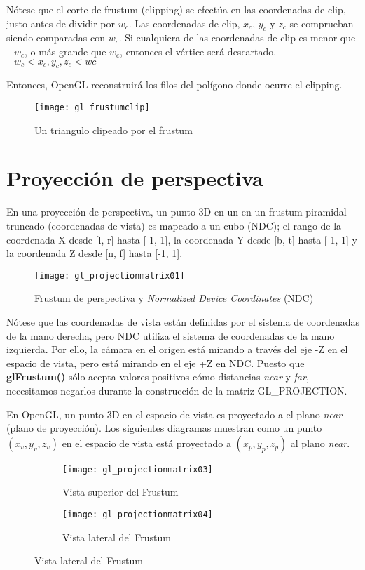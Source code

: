 Nótese que el corte de frustum (clipping) se efectúa en las coordenadas de clip, justo antes de dividir por $w_c$. Las coordenadas de clip, $x_c$, $y_c$ y $z_c$ se comprueban siendo comparadas con $w_c$. Si cualquiera de las coordenadas de clip es menor que $-w_c$, o más grande que $w_c$, entonces el vértice será descartado.
$ -w_c < x_c, y_c, z_c < wc $

Entonces, OpenGL reconstruirá los filos del polígono donde ocurre el clipping.

\begin{figure} [h]
  \centering
  \texttt{[image: gl\_frustumclip]}
  \caption{Un triangulo clipeado por el frustum}
\end{figure}

\section{Proyección de perspectiva}
En una proyección de perspectiva, un punto 3D en un en un frustum piramidal truncado (coordenadas de vista) es mapeado a un cubo (NDC); el rango de la coordenada X desde [l, r] hasta [-1, 1], la coordenada Y desde [b, t] hasta [-1, 1] y la coordenada Z desde [n, f] hasta [-1, 1].

\begin{figure} [h]
  \centering
  \texttt{[image: gl\_projectionmatrix01]}
  \caption{Frustum de perspectiva y \textit{Normalized Device Coordinates} (NDC)}
\end{figure}




Nótese que las coordenadas de vista están definidas por el sistema de coordenadas de la mano derecha, pero NDC utiliza el sistema de coordenadas de la mano izquierda. Por ello, la cámara en el origen está mirando a través del eje -Z en el espacio de vista, pero está mirando en el eje +Z en NDC. Puesto que \textbf{glFrustum()} sólo acepta valores positivos cómo distancias \textit{near} y \textit{far}, necesitamos negarlos durante la construcción de la matriz GL\_PROJECTION.

En OpenGL, un punto 3D en el espacio de vista es proyectado a el plano \textit{near} (plano de proyección). Los siguientes diagramas muestran como un punto $(x_v, y_v, z_v)$ en el espacio de vista está proyectado a $(x_p, y_p, z_p)$ al plano \textit{near}.

\begin{figure} [h]
  \centering
  \captionsetup[subfigure]{justification=centering}
  \begin{subfigure}{0.3\textwidth} 
    \texttt{[image: gl\_projectionmatrix03]} 
    \caption{Vista superior del Frustum}
  \end{subfigure}
  \begin{subfigure}{0.3\textwidth}
    \texttt{[image: gl\_projectionmatrix04]} 
    \caption{Vista lateral del Frustum}
  \end{subfigure}
\end{figure}

